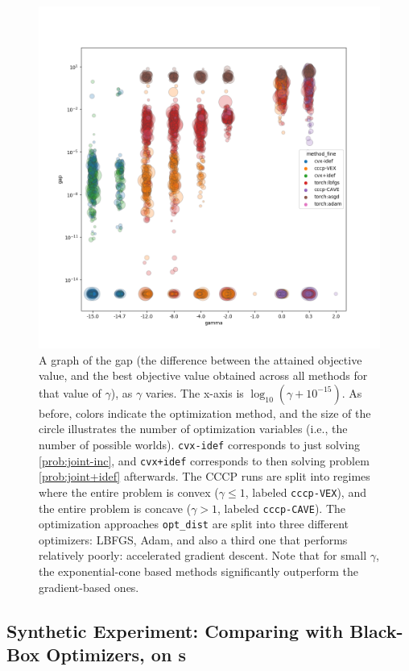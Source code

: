 \begin{subappendices}
\begin{figure}
    \includegraphics[width=\linewidth]{figs/2}
    \caption{
        A graph of the gap (the difference between the attained objective value, and the best objective value obtained across all methods for that value of $\gamma$),
        as $\gamma$ varies. The x-axis is $\log_{10} ( \gamma + 10^{-15})$.
        As before, colors indicate the optimization method, and
        the size of the circle illustrates the number of optimization variables (i.e., the number of possible worlds).
        \texttt{cvx-idef} corresponds to just solving \eqref{prob:joint-inc}, and \texttt{cvx+idef} corresponds to then solving problem \eqref{prob:joint+idef} afterwards.
        The CCCP runs are split into regimes where the entire problem is convex ($\gamma \le 1$, labeled \texttt{cccp-VEX}), and the entire problem is concave ($\gamma > 1$, labeled \texttt{cccp-CAVE}).
        The optimization approaches \texttt{opt\_dist} are split into three different optimizers: LBFGS, Adam, and also a third one that
        performs relatively poorly: accelerated gradient descent.
        Note that for small $\gamma$, the exponential-cone based methods significantly outperform the gradient-based ones.
    }\label{fig:gamma-v-gap-fine}
\end{figure}


\subsection{Synthetic Experiment: Comparing with Black-Box Optimizers, on \AcTree s} \label{sec:clus-expt-details}


\end{subappendices}
